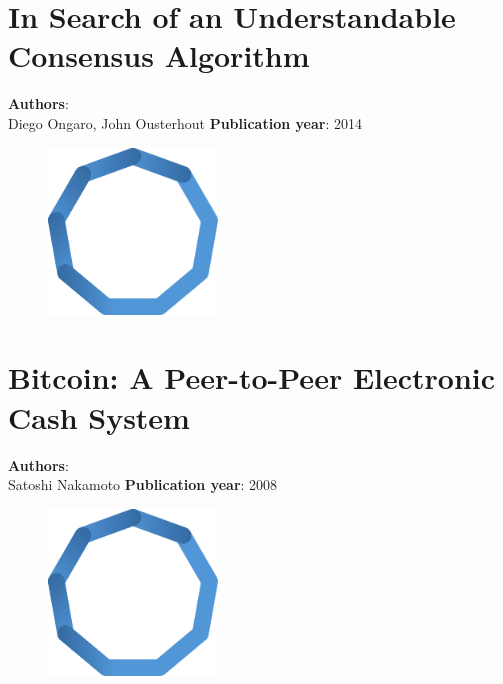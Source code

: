 \documentclass[11pt,fleqn]{book} %
\begin{document}
\chapter{In Search of an Understandable Consensus Algorithm}
\vspace*{-7mm}
\Large \textbf{Authors}: \\
Diego Ongaro, John Ousterhout
\newline\newline
\textbf{Publication year}: 2014
\begin{figure}[b]
    \centering
    \includegraphics[width=0.4\textwidth]{distributed-systems-blue.pdf}
\end{figure}


\chapter{Bitcoin: A Peer-to-Peer Electronic Cash System}
\vspace*{-7mm}
\Large \textbf{Authors}: \\
Satoshi Nakamoto
\newline\newline
\textbf{Publication year}: 2008
\begin{figure}[b]
    \centering
    \includegraphics[width=0.4\textwidth]{distributed-systems-blue.pdf}
\end{figure}

\end{document}
